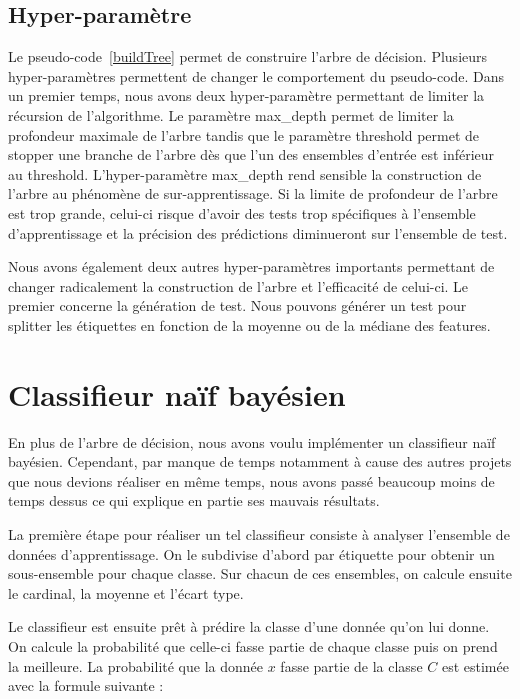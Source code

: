 \documentclass[french, 14pt]{memoir}
\begin{document}
\subsection{Hyper-paramètre}

Le pseudo-code~\ref{buildTree} permet de construire l'arbre de décision. Plusieurs hyper-paramètres permettent de changer le comportement du pseudo-code. Dans un premier temps, nous avons deux hyper-paramètre permettant de limiter la récursion de l'algorithme. Le paramètre max\_depth permet de limiter la profondeur maximale de l'arbre tandis que le paramètre threshold permet de stopper une branche de l'arbre dès que l'un des ensembles d'entrée est inférieur au threshold. L'hyper-paramètre max\_depth rend sensible la construction de l'arbre au phénomène de sur-apprentissage. Si la limite de profondeur de l'arbre est trop grande, celui-ci risque d'avoir des tests trop spécifiques à l'ensemble d'apprentissage et la précision des prédictions diminueront sur l'ensemble de test.

Nous avons également deux autres hyper-paramètres importants permettant de changer radicalement la construction de l'arbre et l'efficacité de celui-ci. Le premier concerne la génération de test. Nous pouvons générer un test pour splitter les étiquettes en fonction de la moyenne ou de la médiane des features. 


\section{Classifieur naïf bayésien}

En plus de l'arbre de décision, nous avons voulu implémenter un classifieur naïf bayésien. Cependant, par manque de temps notamment à cause des autres projets que nous devions réaliser en même temps, nous avons passé beaucoup moins de temps dessus ce qui explique en partie ses mauvais résultats.

La première étape pour réaliser un tel classifieur consiste à analyser l'ensemble de données d'apprentissage. On le subdivise d'abord par étiquette pour obtenir un sous-ensemble pour chaque classe. Sur chacun de ces ensembles, on calcule ensuite le cardinal, la moyenne et l'écart type.

Le classifieur est ensuite prêt à prédire la classe d'une donnée qu'on lui donne. On calcule la probabilité que celle-ci fasse partie de chaque classe puis on prend la meilleure. La probabilité que la donnée $x$ fasse partie de la classe $C$ est estimée avec la formule suivante :
\end{document}
